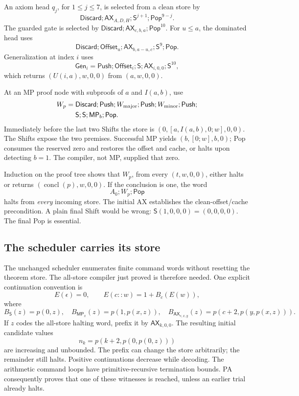 \documentclass[11pt,letterpaper]{article}
\newcommand{\AX}{\mathsf{AX}}
\newcommand{\MP}{\mathsf{MP}}
\newcommand{\Shift}{\mathsf{S}}
\begin{document}
An axiom head \(q_j\), for \(1\le j\le7\), is selected from a clean
store by
\[
 \mathsf{Discard};\AX_{A,D,H};\Shift^{j+1};\mathsf{Pop}^{9-j}.
\]
The guarded gate is selected by
\(\mathsf{Discard};\AX_{c,b,a};\mathsf{Pop}^{10}\).
For \(u\le a\), the dominated head uses
\[
 \mathsf{Discard};\mathsf{Offset}_u;
  \AX_{b,a-u,c};\Shift^9;\mathsf{Pop}.
\]
Generalization at index \(i\) uses
\[
 \mathsf{Gen}_i=\mathsf{Push};\mathsf{Offset}_i;\Shift;
               \AX_{i,0,0};\Shift^{10},
\]
which returns \((U(i,a),w,0,0)\) from \((a,w,0,0)\).

At an MP proof node with subproofs of \(a\) and \(I(a,b)\), use
\[
\begin{split}
 W_p={}&\mathsf{Discard};\mathsf{Push};W_{\rm major};\mathsf{Push};
 W_{\rm minor};\mathsf{Push};\\
 &\Shift;\Shift;\MP_b;\mathsf{Pop}.
\end{split}
\]
Immediately before the last two Shifts the store is
\((0,[a,I(a,b),0;w],0,0)\). The Shifts expose the two premises. Successful
MP yields \((b,[0;w],b,0)\); Pop consumes the reserved zero and restores
the offset and cache, or halts upon detecting \(b=1\). The compiler, not
MP, supplied that zero.

Induction on the proof tree shows that \(W_p\), from every
\((t,w,0,0)\), either halts or returns
\((\operatorname{concl}(p),w,0,0)\). If the conclusion is one, the word
\[
 A_0;W_p;\mathsf{Pop}
\]
halts from \emph{every} incoming store. The initial AX establishes the
clean-offset/cache precondition. A plain final Shift would be wrong:
\(\Shift(1,0,0,0)=(0,0,0,0)\). The final Pop is essential.

\subsection{The scheduler carries its store}

The unchanged scheduler enumerates finite command words without resetting
the theorem store. The all-store compiler just proved is therefore needed.
One explicit continuation convention is
\[
 E(\epsilon)=0,\qquad E(c::w)=1+B_c(E(w)),
\]
where
\[
 B_{\Shift}(z)=p(0,z),\quad
 B_{\MP_x}(z)=p(1,p(x,z)),\quad
 B_{\AX_{c,x,y}}(z)=p(c+2,p(y,p(x,z))).
\]
If \(z\) codes the all-store halting word, prefix it by
\(\AX_{k,0,0}\). The resulting initial candidate values
\[
 n_k=p(k+2,p(0,p(0,z)))
\]
are increasing and unbounded. The prefix can change the store arbitrarily;
the remainder still halts. Positive continuations decrease while decoding.
The arithmetic command loops have primitive-recursive termination bounds.
PA consequently proves that one of these witnesses is reached, unless an
earlier trial already halts.
\end{document}

